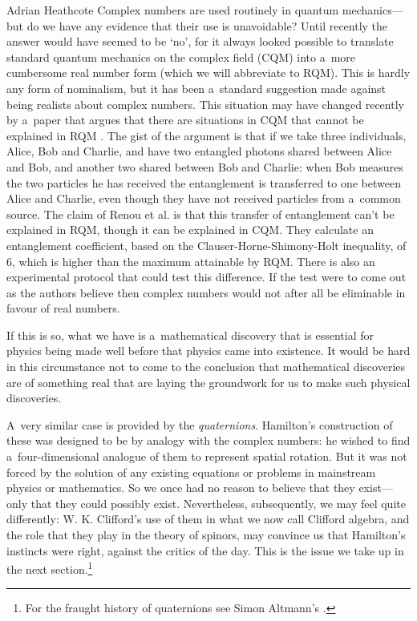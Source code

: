 \begin{artengenv}{Adrian Heathcote}
Complex numbers are used routinely in quantum mechanics---but do we have any evidence that their use is unavoidable? Until recently the answer would have seemed to be `no', for it always looked possible to translate standard quantum mechanics on the complex field (CQM) into a~more cumbersome real number form (which we will abbreviate to RQM). This is hardly any form of nominalism, but it has been a~standard suggestion made against being realists about complex numbers. This situation may have changed recently by a~paper that argues that there are situations in CQM that cannot be explained in RQM \parencite{renou_quantum_2021}. The gist of the argument is that if we take three individuals, Alice, Bob and Charlie, and have two entangled photons shared between Alice and Bob, and another two shared between Bob and Charlie: when Bob measures the two particles he has received the entanglement is transferred to one between Alice and Charlie, even though they have not received particles from a~common source. The claim of Renou et al. \parencite{renou_quantum_2021} is that this transfer of entanglement can't be explained in RQM, though it can be explained in CQM. They calculate an entanglement coefficient, based on the Clauser-Horne-Shimony-Holt inequality, of 6\sqrtwo, which is higher than the maximum attainable by RQM. There is also an experimental protocol that could test this difference. If the test were to come out as the authors believe then complex numbers would not after all be eliminable in favour of real numbers.

If this is so, what we have is a~mathematical discovery that is essential for physics being made well before that physics came into existence. It would be hard in this circumstance not to come to the conclusion that mathematical discoveries are of something real that are laying the groundwork for us to make such physical discoveries.

A~very similar case is provided by the \textit{quaternions}. Hamilton's construction of these was designed to be by analogy with the complex numbers: he wished to find a~four-dimensional analogue of them to represent spatial rotation. But it was not forced by the solution of any existing equations or problems in mainstream physics or mathematics. So we once had no reason to believe that they exist---only that they could possibly exist. Nevertheless, subsequently, we may feel quite differently: W. K. Clifford's use of them in what we now call Clifford algebra, and the role that they play in the theory of spinors, may convince us that Hamilton's instincts were right, against the critics of the day. This is the issue we take up in the next section.\footnote{For the fraught history of quaternions see Simon Altmann's \parencite*{altmann_hamilton_1989}.}




\end{artengenv}
